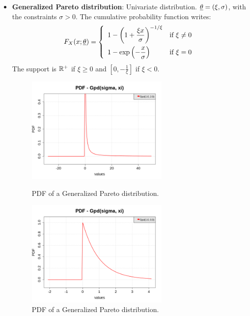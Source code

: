 {\begin{itemize}
\item {\bf Generalized Pareto distribution}: Univariate
distribution. ${\underline{\theta}} = \left( \xi, \sigma \right)$, with the constraints  $\sigma>0$. The cumulative probability function writes:
\begin{equation}
F_X(x;{\underline{\theta}}) = \left\{
\begin{array}{ll}
\displaystyle 1-\left(
1+\frac{\xi x}{\sigma}\right)_{\strut}^{-1/\xi} & \mbox{if } \xi \neq 0 \\
\displaystyle 1-\exp\left(-\frac{x}{\sigma}\right) & \mbox{if } \xi = 0
\end{array}
\right.
\end{equation}
The support is ${\mathbb R}^+$ if $\xi \geq 0$ and $[0, -\frac{1}{\xi}]$ if $\xi < 0$.

\begin{figure}[H]
\begin{minipage}{8cm}
\begin{center}
\includegraphics[width=7cm]{Figures/pdf_GPD_1.png}
\caption{PDF of a Generalized Pareto distribution.}
\end{center}
\end{minipage}
\hfill
\begin{minipage}{8cm}
\begin{center}
\includegraphics[width=7cm]{Figures/pdf_GPD_2.png}
\caption{PDF of a Generalized Pareto distribution.}
\end{center}
\end{minipage}
\end{figure}



\end{itemize}}
